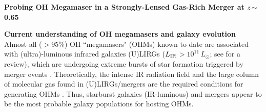 \documentclass[letterpaper,11pt]{article}
\newcommand{\Lsun}{\mbox{$L_{\odot}$}\xspace}
\newcommand{\LIR}{\mbox{$L_{\rm IR}$}\xspace}
\newcommand{\ssim}{\,$\sim$\,}
\begin{document}
\pagestyle{plain}



\begin{center}
{\large{\bf{Probing OH Megamaser in a Strongly-Lensed Gas-Rich Merger at $z$\ssim0.65}}}
\end{center}
\vspace{-.8em}
\textbf{Current understanding of OH megamasers and galaxy evolution} \\
\indent Almost all ($>$95\%) OH ``megamasers" (OHMs) known to date are associated with 
(ultra)-luminous infrared galaxies (U)LIRGs (\LIR$>10^{11}$\,\Lsun; see \citealt[]{Lo05a} for a review), 
which are undergoing extreme bursts of star formation triggered by merger events
\citep[e.g.,][]{Sanders96a, Hopkins06b}.
Theoretically, the intense IR radiation field and the large column of molecular gas 
found in (U)LIRGs/mergers
are the required conditions for generating OHMs \citep[e.g.][]{Baan89a}.
Thus, starburst galaxies (IR-luminous) and mergers appear to be the most probable galaxy populations for hosting OHMs.
\end{document}
